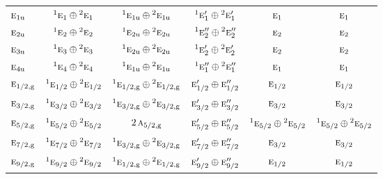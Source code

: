 \documentclass[10pt,a4paper]{article}
\numberwithin{equation}{section}
\newcommand{\irr}[1]{\text{\normalfont\scshape #1}}
\newcommand{\conjpair}[1]{{}^{#1}}
\newcommand{\ptag}[1]{\mathrm{#1}}
\begin{document}
{\begin{longtable}{@{}lccccc@{}}
$\irr{e}_{1\ptag{u}}$ & $\conjpair{1}\irr{e}_{1}\oplus \conjpair{2}\irr{e}_{1}$ & $\conjpair{1}\irr{e}_{1\ptag{u}}\oplus \conjpair{2}\irr{e}_{1\ptag{u}}$ & $\conjpair{1}\irr{e}_{1}'\oplus \conjpair{2}\irr{e}_{1}'$ & $\irr{e}_{1}$ & $\irr{e}_{1}$\\
$\irr{e}_{2\ptag{u}}$ & $\conjpair{1}\irr{e}_{2}\oplus \conjpair{2}\irr{e}_{2}$ & $\conjpair{1}\irr{e}_{2\ptag{u}}\oplus \conjpair{2}\irr{e}_{2\ptag{u}}$ & $\conjpair{1}\irr{e}_{2}''\oplus \conjpair{2}\irr{e}_{2}''$ & $\irr{e}_{2}$ & $\irr{e}_{2}$\\
$\irr{e}_{3\ptag{u}}$ & $\conjpair{1}\irr{e}_{3}\oplus \conjpair{2}\irr{e}_{3}$ & $\conjpair{1}\irr{e}_{2\ptag{u}}\oplus \conjpair{2}\irr{e}_{2\ptag{u}}$ & $\conjpair{1}\irr{e}_{2}'\oplus \conjpair{2}\irr{e}_{2}'$ & $\irr{e}_{2}$ & $\irr{e}_{2}$\\
$\irr{e}_{4\ptag{u}}$ & $\conjpair{1}\irr{e}_{4}\oplus \conjpair{2}\irr{e}_{4}$ & $\conjpair{1}\irr{e}_{1\ptag{u}}\oplus \conjpair{2}\irr{e}_{1\ptag{u}}$ & $\conjpair{1}\irr{e}_{1}''\oplus \conjpair{2}\irr{e}_{1}''$ & $\irr{e}_{1}$ & $\irr{e}_{1}$\\
$\irr{e}_{1/2,\ptag{g}}$ & $\conjpair{1}\irr{e}_{1/2}\oplus \conjpair{2}\irr{e}_{1/2}$ & $\conjpair{1}\irr{e}_{1/2,\ptag{g}}\oplus \conjpair{2}\irr{e}_{1/2,\ptag{g}}$ & $\irr{e}_{1/2}'\oplus \irr{e}_{1/2}''$ & $\irr{e}_{1/2}$ & $\irr{e}_{1/2}$\\
$\irr{e}_{3/2,\ptag{g}}$ & $\conjpair{1}\irr{e}_{3/2}\oplus \conjpair{2}\irr{e}_{3/2}$ & $\conjpair{1}\irr{e}_{3/2,\ptag{g}}\oplus \conjpair{2}\irr{e}_{3/2,\ptag{g}}$ & $\irr{e}_{3/2}'\oplus \irr{e}_{3/2}''$ & $\irr{e}_{3/2}$ & $\irr{e}_{3/2}$\\
$\irr{e}_{5/2,\ptag{g}}$ & $\conjpair{1}\irr{e}_{5/2}\oplus \conjpair{2}\irr{e}_{5/2}$ & $2\,\irr{a}_{5/2,\ptag{g}}$ & $\irr{e}_{5/2}'\oplus \irr{e}_{5/2}''$ & $\conjpair{1}\irr{e}_{5/2}\oplus \conjpair{2}\irr{e}_{5/2}$ & $\conjpair{1}\irr{e}_{5/2}\oplus \conjpair{2}\irr{e}_{5/2}$\\
$\irr{e}_{7/2,\ptag{g}}$ & $\conjpair{1}\irr{e}_{7/2}\oplus \conjpair{2}\irr{e}_{7/2}$ & $\conjpair{1}\irr{e}_{3/2,\ptag{g}}\oplus \conjpair{2}\irr{e}_{3/2,\ptag{g}}$ & $\irr{e}_{7/2}'\oplus \irr{e}_{7/2}''$ & $\irr{e}_{3/2}$ & $\irr{e}_{3/2}$\\
$\irr{e}_{9/2,\ptag{g}}$ & $\conjpair{1}\irr{e}_{9/2}\oplus \conjpair{2}\irr{e}_{9/2}$ & $\conjpair{1}\irr{e}_{1/2,\ptag{g}}\oplus \conjpair{2}\irr{e}_{1/2,\ptag{g}}$ & $\irr{e}_{9/2}'\oplus \irr{e}_{9/2}''$ & $\irr{e}_{1/2}$ & $\irr{e}_{1/2}$\\

\end{longtable}}
\end{document}
